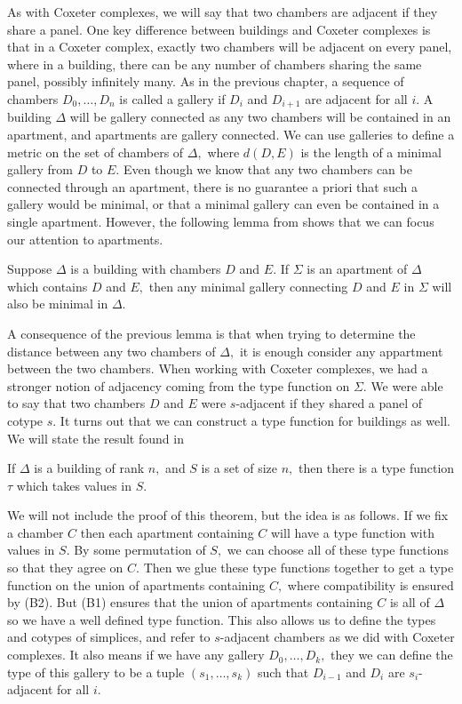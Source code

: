 \documentclass[class=book, crop=false,12 pt]{standalone}
\begin{document}
As with Coxeter complexes, we will say that two chambers are adjacent if they share a panel. One key difference between buildings and Coxeter complexes is that in a Coxeter complex, exactly two chambers will be adjacent on every panel, where in a building, there can be any number of chambers sharing the same panel, possibly infinitely many. As in the previous chapter, a sequence of chambers $D_0,\dots,D_n$ is called a gallery if $D_i$ and $D_{i+1}$ are adjacent for all $i.$ A building $\Delta$ will be gallery connected as any two chambers will be contained in an apartment, and apartments are gallery connected. We can use galleries to define a metric on the set of chambers of $\Delta,$ where $d(D,E)$ is the length of a minimal gallery from $D$ to $E.$ Even though we know that any two chambers can be connected through an apartment, there is no guarantee a priori that such a gallery would be minimal, or that a minimal gallery can even be contained in a single apartment. However, the following lemma from \cite{buildings} shows that we can focus our attention to apartments.

\begin{lemma}
	\label{lem:dist}
	Suppose $\Delta$ is a building with chambers $D$ and $E.$ If $\Sigma$ is an apartment of $\Delta$ which contains $D$ and $E,$ then any minimal gallery connecting $D$ and $E$ in $\Sigma$ will also be minimal in $\Delta.$
\end{lemma}

A consequence of the previous lemma is that when trying to determine the distance between any two chambers of $\Delta,$ it is enough consider any appartment between the two chambers. When working with Coxeter complexes, we had a stronger notion of adjacency coming from the type function on $\Sigma.$ We were able to say that two chambers $D$ and $E$ were $s$-adjacent if they shared a panel of cotype $s.$ It turns out that we can construct a type function for buildings as well. We will state the result found in \cite{buildings}
\begin{theorem}
	\label{thm:type}
	If $\Delta$ is a building of rank $n,$ and $S$ is a set of size $n,$ then there is a type function $\tau$ which takes values in $S.$
\end{theorem}

We will not include the proof of this theorem, but the idea is as follows. If we fix a chamber $C$ then each apartment containing $C$ will have a type function with values in $S.$ By some permutation of $S,$ we can choose all of these type functions so that they agree on $C.$ Then we glue these type functions together to get a type function on the union of apartments containing $C,$ where compatibility is ensured by (B2). But (B1) ensures that the union of apartments containing $C$ is all of $\Delta$ so we have a well defined type function. This also allows us to define the types and cotypes of simplices, and refer to $s$-adjacent chambers as we did with Coxeter complexes. It also means if we have any gallery $D_0,\dots,D_k,$ they we can define the type of this gallery to be a tuple $(s_1,\dots,s_k)$ such that $D_{i-1}$ and $D_i$ are $s_i$-adjacent for all $i.$
\end{document}
